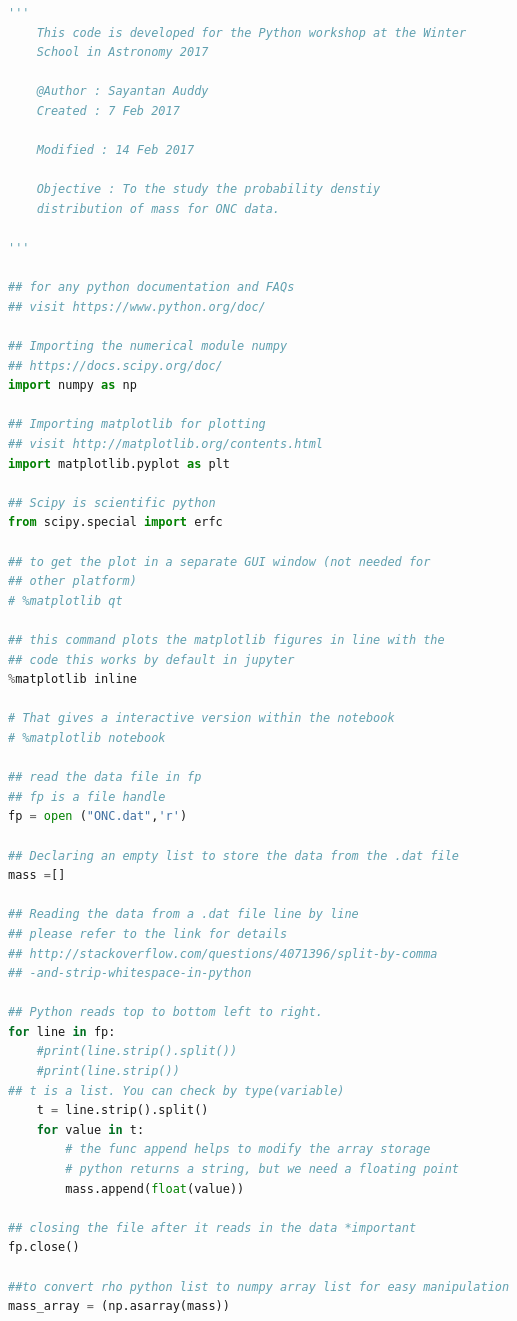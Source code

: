 \documentclass{article}
\begin{document}
\begin{lstlisting}[language=Python, caption=Python example]
''' 
    This code is developed for the Python workshop at the Winter
    School in Astronomy 2017
    
    @Author : Sayantan Auddy
    Created : 7 Feb 2017
    
    Modified : 14 Feb 2017
    
    Objective : To the study the probability denstiy 
    distribution of mass for ONC data.

'''

## for any python documentation and FAQs
## visit https://www.python.org/doc/

## Importing the numerical module numpy
## https://docs.scipy.org/doc/ 
import numpy as np  

## Importing matplotlib for plotting
## visit http://matplotlib.org/contents.html
import matplotlib.pyplot as plt 

## Scipy is scientific python 
from scipy.special import erfc

## to get the plot in a separate GUI window (not needed for 
## other platform)
# %matplotlib qt  

## this command plots the matplotlib figures in line with the 
## code this works by default in jupyter 
%matplotlib inline  

# That gives a interactive version within the notebook
# %matplotlib notebook

## read the data file in fp
## fp is a file handle
fp = open ("ONC.dat",'r')

## Declaring an empty list to store the data from the .dat file
mass =[]

## Reading the data from a .dat file line by line
## please refer to the link for details  
## http://stackoverflow.com/questions/4071396/split-by-comma
## -and-strip-whitespace-in-python

## Python reads top to bottom left to right.
for line in fp:
    #print(line.strip().split())
    #print(line.strip())
## t is a list. You can check by type(variable)
    t = line.strip().split()              
    for value in t:
        # the func append helps to modify the array storage
        # python returns a string, but we need a floating point
        mass.append(float(value))         

## closing the file after it reads in the data *important 
fp.close()  

##to convert rho python list to numpy array list for easy manipulation
mass_array = (np.asarray(mass))           



\end{lstlisting}
\end{document}
